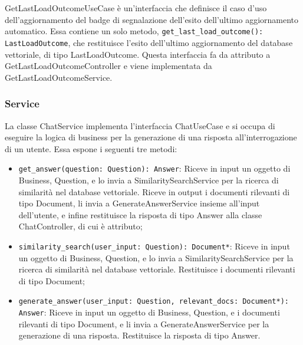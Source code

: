 \label{sec:get_last_load_outcome_use_case}
GetLastLoadOutcomeUseCase è un'interfaccia che definisce il caso d'uso dell'aggiornamento del badge di segnalazione dell'esito dell'ultimo aggiornamento automatico. Essa contiene un solo metodo, \texttt{get\_last\_load\_outcome(): LastLoadOutcome}, che restituisce l'esito dell'ultimo aggiornamento del database vettoriale, di tipo LastLoadOutcome. Questa interfaccia fa da attributo a GetLastLoadOutcomeController e viene implementata da GetLastLoadOutcomeService.

\newpage


\subsubsection{Service}
\label{sec:service_backend}

\label{sec:chat_service}
La classe ChatService implementa l'interfaccia ChatUseCase e si occupa di eseguire la logica di business per la generazione di una risposta all'interrogazione di un utente.
Essa espone i seguenti tre metodi:
\begin{itemize}
    \item \texttt{get\_answer(question: Question): Answer}: Riceve in input un oggetto di Business, Question, e lo invia a SimilaritySearchService per la ricerca di similarità nel database vettoriale. Riceve in output i documenti rilevanti di tipo Document, li invia a GenerateAnswerService insieme all'input dell'utente, e infine restituisce la risposta di tipo Answer alla classe ChatController, di cui è attributo;
    \item \texttt{similarity\_search(user\_input: Question): Document*}: Riceve in input un oggetto di Business, Question, e lo invia a SimilaritySearchService per la ricerca di similarità nel database vettoriale. Restituisce i documenti rilevanti di tipo Document;
    \item \texttt{generate\_answer(user\_input: Question, relevant\_docs: Document*): Answer}: Riceve in input un oggetto di Business, Question, e i documenti rilevanti di tipo Document, e li invia a GenerateAnswerService per la generazione di una risposta. Restituisce la risposta di tipo Answer.
\end{itemize}

